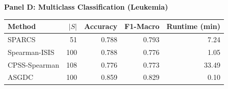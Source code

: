 \textbf{Panel D: Multiclass Classification (Leukemia)}\\[2pt]
\begin{tabular}{lrrrr}
\toprule
Method & $|S|$ & Accuracy & F1-Macro & Runtime (min) \\
\midrule
SPARCS & 51 & 0.788 & 0.793 & 7.24 \\
Spearman-ISIS & 100 & 0.788 & 0.776 & 1.05 \\
CPSS-Spearman & 108 & 0.776 & 0.773 & 33.49 \\
ASGDC & 100 & 0.859 & 0.829 & 0.10 \\
\bottomrule
\end{tabular}\\[10pt]
